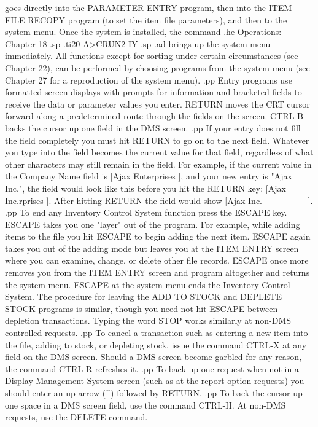 goes directly into the PARAMETER ENTRY program, then into the ITEM FILE
RECOPY program (to set the item file parameters), and then to the system
menu.  Once the system is installed, the command
.he Operations: Chapter 18
.sp
.ti20
A>CRUN2 IY
.sp
.ad
brings up the system menu immediately.	All functions except for
sorting under certain circumstances (see Chapter 22), can be performed
by choosing programs from the system menu (see Chapter 27 for a reproduction
of the system menu).
.pp
Entry programs use formatted screen displays with prompts for information
and bracketed fields to receive the data or
parameter values you enter.  RETURN moves the CRT cursor forward
along a predetermined route
through the fields on the screen.  CTRL-B backs the cursor up one field in the
DMS screen.
.pp
If your entry does not fill the field completely you must hit RETURN to
go on to the next field.  Whatever you type into the field becomes the
current value for that field, regardless of what other characters may
still remain in the field.  For example, if the current value in the
Company Name field is [Ajax Enterprises 	], and your new entry
is "Ajax Inc.", the field would look like this before you hit the
RETURN key: [Ajax Inc.rprises	      ].  After hitting RETURN the field
would show [Ajax Inc.----------------].
.pp
To end any Inventory Control System function press the ESCAPE key.
ESCAPE takes you one "layer" out of the program.  For example,
while adding items to the file you hit ESCAPE to begin adding the next
item.  ESCAPE again takes you out of the adding mode but leaves
you at the ITEM ENTRY screen where you can examine, change, or delete
other file records.  ESCAPE once more removes you from the ITEM ENTRY
screen and program altogether and returns the system menu.  ESCAPE at the
system menu ends the Inventory Control System.	The procedure for leaving
the ADD TO STOCK and DEPLETE STOCK programs is similar, though you need not
hit ESCAPE between depletion transactions.
Typing the word
STOP works similarly at non-DMS controlled requests.
.pp
To cancel a transaction such as entering a new item into the file, adding
to stock, or depleting stock, issue the command CTRL-X at any field on the
DMS screen.  Should a DMS screen become garbled for any reason, the command
CTRL-R refreshes it.
.pp
To back up one request when not in a Display Management System
screen (such as at the report option requests) you should enter an up-arrow
(^) followed by RETURN.
.pp
To back the cursor up one space in a DMS screen field, use the command
CTRL-H.  At non-DMS requests, use the DELETE command.
